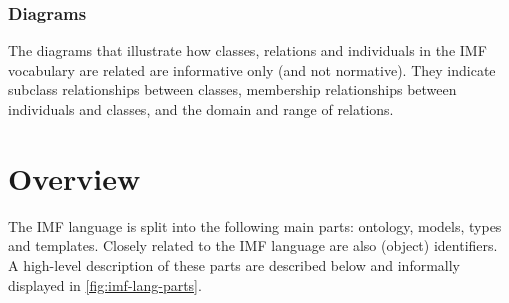 \subsubsection*{Diagrams}

The diagrams that illustrate how classes, relations and
individuals in the IMF vocabulary are related are informative only
(and not normative). They indicate subclass relationships between
classes, membership relationships between individuals and classes, and
the domain and range of relations.



\section{Overview}


The IMF language is split into the following main parts: ontology,
models, types and templates. Closely related to the IMF language are also
(object) identifiers. A high-level description of these parts
are described below and informally displayed in
\autoref{fig:imf-lang-parts}.

